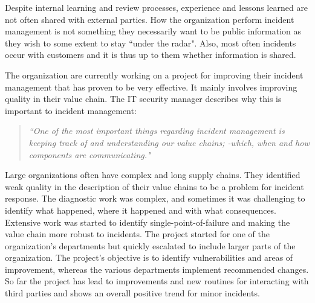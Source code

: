 Despite internal learning and review processes, experience and lessons learned are not often shared with external parties. How the organization perform incident management is not something they necessarily want to be public information as they wish to some extent to stay ``under the radar". Also, most often incidents occur with customers and it is thus up to them whether information is shared. 

The organization are currently working on a project for improving their incident management that has proven to be very effective. It mainly involves improving quality in their value chain. The IT security manager describes why this is important to incident management:
\begin{quote}
\textit{``One of the most important things regarding incident management is keeping track of and understanding our value chains; -which, when and how components are communicating."}
\end{quote}
Large organizations often have complex and long supply chains. They identified weak quality in the description of their value chains to be a problem for incident response. The diagnostic work was complex, and sometimes it was challenging to identify what happened, where it happened and with what consequences. Extensive work was started to identify single-point-of-failure and making the value chain more robust to incidents. The project started for one of the organization's departments but quickly escalated to include larger parts of the organization. The project's objective is to identify vulnerabilities and areas of improvement, whereas the various departments implement recommended changes. So far the project has lead to improvements and new routines for interacting with third parties and shows an overall positive trend for minor incidents. 